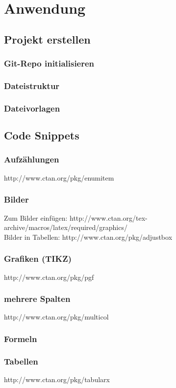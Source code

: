 \section{Anwendung}
\subsection{Projekt erstellen}
\subsubsection{Git-Repo initialisieren}
\subsubsection{Dateistruktur}
\subsubsection{Dateivorlagen}

\subsection{Code Snippets}

\subsubsection{Aufzählungen}
http://www.ctan.org/pkg/enumitem

\subsubsection{Bilder}
Zum Bilder einfügen: http://www.ctan.org/tex-archive/macros/latex/required/graphics/ \\
Bilder in Tabellen: http://www.ctan.org/pkg/adjustbox

\subsubsection{Grafiken (TIKZ)}
http://www.ctan.org/pkg/pgf

\subsubsection{mehrere Spalten}
http://www.ctan.org/pkg/multicol


\subsubsection{Formeln}
\subsubsection{Tabellen}
http://www.ctan.org/pkg/tabularx